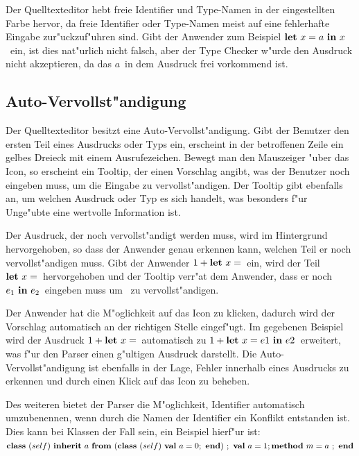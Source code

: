 Der Quelltexteditor hebt freie Identifier und Type-Namen in der eingestellten
Farbe hervor, da freie Identifier oder Type-Namen meist auf eine
fehlerhafte Eingabe zur"uckzuf"uhren sind. Gibt der Anwender zum Beispiel
\glqq$\bli{x}{a}{x}$\grqq\ ein, ist dies nat"urlich nicht falsch, aber
der Type Checker w"urde den Ausdruck nicht akzeptieren, da das 
\glqq$a$\grqq\ in dem Ausdruck frei vorkommend ist.

\subsection{Auto-Vervollst"andigung}
\label{Auto-Vervollstaendigung}
Der Quelltexteditor besitzt eine Auto-Vervollst"andigung. Gibt der Benutzer
den ersten Teil eines Ausdrucks oder Typs ein, erscheint in der betroffenen
Zeile ein gelbes Dreieck mit einem Ausrufezeichen. Bewegt man den Mauszeiger 
"uber das Icon, so erscheint ein Tooltip, der einen Vorschlag angibt, was der
Benutzer noch eingeben muss, um die Eingabe zu vervollst"andigen. Der
Tooltip gibt ebenfalls an, um welchen Ausdruck oder Typ es sich handelt, was
besonders f"ur Unge"ubte eine wertvolle Information ist.

Der Ausdruck, der noch vervollst"andigt werden muss, wird im Hintergrund
hervorgehoben, so dass der Anwender genau erkennen kann, welchen Teil er
noch vervollst"andigen muss. Gibt der Anwender \glqq$\infix{+}{1}{\blet\ x =}$\grqq\ 
ein, wird der Teil \glqq$\blet\ x =$\grqq\ hervorgehoben und der Tooltip
verr"at dem Anwender, dass er noch \glqq$e_1\ \bin\ e_2$\grqq\ eingeben muss
um \glqq{\bf Let}\grqq\ zu vervollst"andigen.

Der Anwender hat die M"oglichkeit auf das Icon zu klicken, dadurch wird der 
Vorschlag automatisch an der richtigen Stelle eingef"ugt. Im gegebenen Beispiel
wird der Ausdruck \glqq$\infix{+}{1}{\blet\ x =}$\grqq\ automatisch zu
\glqq$\infix{+}{1}{\bli{x}{e1}{e2}}$\grqq\ erweitert, was f"ur den Parser einen
g"ultigen Ausdruck darstellt. Die Auto-Vervollst"andigung ist ebenfalls in
der Lage, Fehler innerhalb eines Ausdrucks zu erkennen und durch einen Klick
auf das Icon zu beheben.

Des weiteren bietet der Parser die M"oglichkeit, Identifier automatisch
umzubenennen, wenn durch die Namen der Identifier ein Konflikt entstanden
ist. Dies kann bei Klassen der Fall sein, ein Beispiel hierf"ur ist:\\[2mm]
\glqq$\class{self}{\inherit{a}{(\class{self}{\attr{a}{0}})}{\attr{a}{1} \method{m}{a}}}$\grqq

